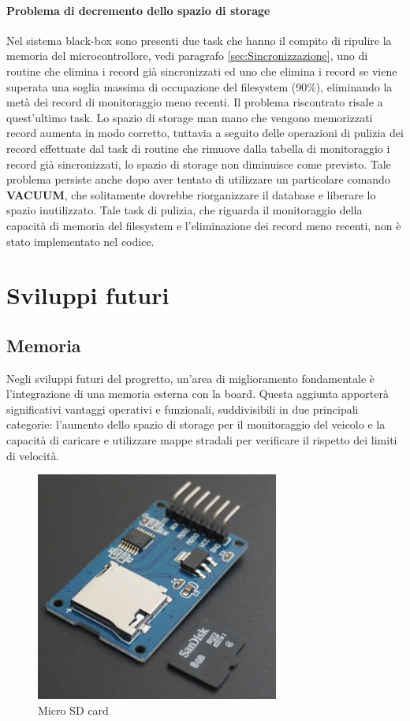 \documentclass[12pt, a4paper, italian]{report}
\numberwithin{figure}{chapter}
\numberwithin{table}{chapter}
\begin{document}
\paragraph{Problema di decremento dello spazio di storage}
Nel sistema black-box sono presenti due task che hanno il compito di ripulire la memoria del microcontrollore, vedi paragrafo \ref{sec:Sincronizzazione}, uno di routine che elimina i record già sincronizzati ed uno che elimina i record se viene superata una soglia massima di occupazione del filesystem (90\%), eliminando la metà dei record di monitoraggio meno recenti. Il problema riscontrato risale a quest'ultimo task. Lo spazio di storage man mano che vengono memorizzati record aumenta in modo corretto, tuttavia a seguito delle operazioni di pulizia dei record effettuate dal task di routine che rimuove dalla tabella di monitoraggio i record già sincronizzati, lo spazio di storage non diminuisce come previsto. Tale problema persiste anche dopo aver tentato di utilizzare un particolare comando \textbf{VACUUM}, che solitamente dovrebbe riorganizzare il database e liberare lo spazio inutilizzato. 
Tale task di pulizia, che riguarda il monitoraggio della capacità di memoria del filesystem e l'eliminazione dei record meno recenti, non è stato implementato nel codice.

\section{Sviluppi futuri}
\subsection{Memoria}
Negli sviluppi futuri del progretto, un'area di miglioramento fondamentale è l'integrazione di una memoria esterna con la board. Questa aggiunta apporterà significativi vantaggi operativi e funzionali, suddivisibili in due principali categorie: l'aumento dello spazio di storage per il monitoraggio del veicolo e la capacità di caricare e utilizzare mappe stradali per verificare il rispetto dei limiti di velocità.

\begin{figure}[h]
  \centering
  \includegraphics[width=8cm]{MicroSD.png}
  \caption{Micro SD card}
  \label{fig:MicroSD}
\end{figure}
\end{document}
